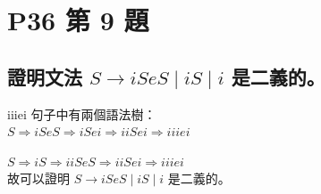 \documentclass[12pt, a4paper]{article}
\begin{document}
\section{P36 第 9 題}
    \subsection{證明文法 $S \rightarrow iSeS \mid iS \mid i$ 是二義的。}

    {iiiei 句子中有兩個語法樹：}\\

    {$S \Rightarrow iSeS \Rightarrow iSei \Rightarrow iiSei \Rightarrow iiiei$}

    {$S \Rightarrow iS \Rightarrow iiSeS \Rightarrow iiSei \Rightarrow iiiei$}\\

    {故可以證明 $S \rightarrow iSeS \mid iS \mid i$ 是二義的。}
\end{document}
